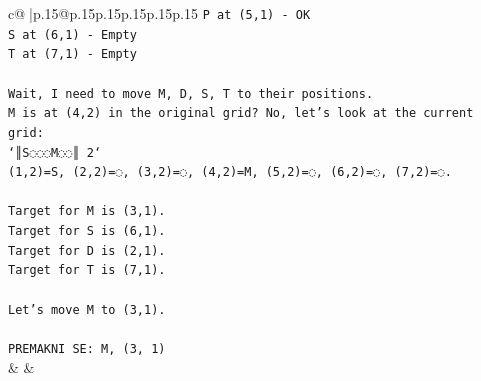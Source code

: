 \documentclass{article}
\begin{document}
{\begin{supertabular}{c@{$\;$}|p{.15\linewidth}@{}p{.15\linewidth}p{.15\linewidth}p{.15\linewidth}p{.15\linewidth}p{.15\linewidth}}
{{{\texttt{P at (5,1) {-} OK} \\
\texttt{S at (6,1) {-} Empty} \\
\texttt{T at (7,1) {-} Empty} \\
\\ 
\texttt{Wait, I need to move M, D, S, T to their positions.} \\
\texttt{M is at (4,2) in the original grid? No, let's look at the current grid:} \\
\texttt{`║S◌◌◌M◌◌║ 2`} \\
\texttt{(1,2)=S, (2,2)=◌, (3,2)=◌, (4,2)=M, (5,2)=◌, (6,2)=◌, (7,2)=◌.} \\
\\ 
\texttt{Target for M is (3,1).} \\
\texttt{Target for S is (6,1).} \\
\texttt{Target for D is (2,1).} \\
\texttt{Target for T is (7,1).} \\
\\ 
\texttt{Let's move M to (3,1).} \\
\\ 
\texttt{PREMAKNI SE: M, (3, 1)} \\
            }
        }
    }
    & & \\ \\


\end{supertabular}}
\end{document}
